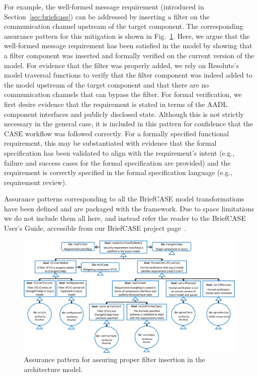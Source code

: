 For example, the well-formed message requirement (introduced in Section~\ref{sec:briefcase}) can be addressed by inserting a filter on the communication channel upstream of the target component.  The corresponding assurance pattern for this mitigation is shown in Fig.~\ref{fig:filter}.  
Here, we argue that the well-formed message requirement has been satisfied in the model by showing that a filter component was inserted and formally verified on the current version of the model.  
%
For evidence that the filter was properly added, we rely on Resolute's model traversal functions to verify that the filter component was indeed added to the model upstream of the target component and that there are no communication channels that can bypass the filter.
%
For formal verification, we first desire evidence that the requirement is stated in terms of the AADL component interfaces and publicly disclosed state. Although this is not strictly necessary in the general case, it is included in this pattern for confidence that the CASE workflow was followed correctly.  For a formally specified functional requirement, this may be substantiated with evidence that the formal specification has been validated to align with the requirement's intent (e.g., failure and success cases for the formal specification are provided)
and the requirement is correctly specified in the formal specification language (e.g., requirement review).

Assurance patterns corresponding to all the BriefCASE model transformations have been defined and are packaged with the framework.  Due to space limitations we do not include them all here, and instead refer the reader to the BriefCASE User's Guide, accessible from our BriefCASE project page~\cite{BriefCASE-project}.


\begin{figure}[h] 
	\centering 
	\includegraphics[width=\textwidth]{figs/filter.png}
	\caption{Assurance pattern for assuring proper filter insertion in the architecture model.}
	\label{fig:filter} 
\end{figure}
\vspace{-3mm}

